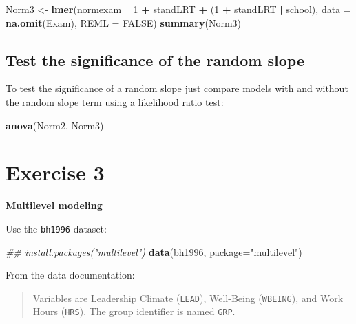 \documentclass[]{book}
\newenvironment{Shaded}{\begin{snugshade}}{\end{snugshade}}
\newcommand{\CommentTok}[1]{\textcolor[rgb]{0.56,0.35,0.01}{\textit{#1}}}
\newcommand{\DataTypeTok}[1]{\textcolor[rgb]{0.13,0.29,0.53}{#1}}
\newcommand{\DecValTok}[1]{\textcolor[rgb]{0.00,0.00,0.81}{#1}}
\newcommand{\KeywordTok}[1]{\textcolor[rgb]{0.13,0.29,0.53}{\textbf{#1}}}
\newcommand{\NormalTok}[1]{#1}
\newcommand{\OperatorTok}[1]{\textcolor[rgb]{0.81,0.36,0.00}{\textbf{#1}}}
\newcommand{\OtherTok}[1]{\textcolor[rgb]{0.56,0.35,0.01}{#1}}
\newcommand{\StringTok}[1]{\textcolor[rgb]{0.31,0.60,0.02}{#1}}
\begin{document}
\begin{Shaded}
\begin{Highlighting}[]
\NormalTok{  Norm3 <-}\StringTok{ }\KeywordTok{lmer}\NormalTok{(normexam }\OperatorTok{~}\StringTok{ }\DecValTok{1} \OperatorTok{+}\StringTok{ }\NormalTok{standLRT }\OperatorTok{+}\StringTok{ }\NormalTok{(}\DecValTok{1} \OperatorTok{+}\StringTok{ }\NormalTok{standLRT }\OperatorTok{|}\StringTok{ }\NormalTok{school), }
                \DataTypeTok{data =} \KeywordTok{na.omit}\NormalTok{(Exam), }\DataTypeTok{REML =} \OtherTok{FALSE}\NormalTok{) }
  \KeywordTok{summary}\NormalTok{(Norm3) }
\end{Highlighting}
\end{Shaded}

\hypertarget{test-the-significance-of-the-random-slope}{%
\subsection{Test the significance of the random slope}\label{test-the-significance-of-the-random-slope}}

To test the significance of a random slope just compare models with and without the random slope term using a likelihood ratio test:

\begin{Shaded}
\begin{Highlighting}[]
  \KeywordTok{anova}\NormalTok{(Norm2, Norm3) }
\end{Highlighting}
\end{Shaded}

\hypertarget{exercise-3-1}{%
\section{Exercise 3}\label{exercise-3-1}}

\textbf{Multilevel modeling}

Use the \texttt{bh1996} dataset:

\begin{Shaded}
\begin{Highlighting}[]
\CommentTok{## install.packages("multilevel")}
\KeywordTok{data}\NormalTok{(bh1996, }\DataTypeTok{package=}\StringTok{"multilevel"}\NormalTok{)}
\end{Highlighting}
\end{Shaded}

From the data documentation:

\begin{quote}
Variables are Leadership Climate (\texttt{LEAD}), Well-Being (\texttt{WBEING}), and Work Hours (\texttt{HRS}). The group identifier is named \texttt{GRP}.
\end{quote}
\end{document}
